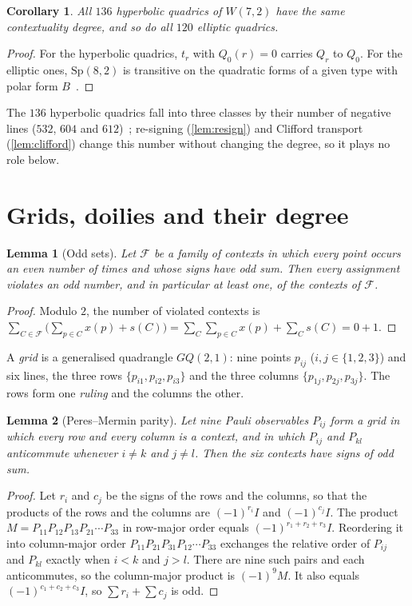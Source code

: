 \documentclass[11pt]{article}
\newtheorem{lemma}[lemma]{Lemma}
\newtheorem{corollary}[corollary]{Corollary}
\theoremstyle{definition}
\theoremstyle{remark}
\newcommand{\Sp}{\mathrm{Sp}}
\begin{document}
\begin{corollary}\label{cor:allquadrics}
All $136$ hyperbolic quadrics of $W(7,2)$ have the same contextuality degree, and so do all $120$ elliptic quadrics.
\end{corollary}
\begin{proof}
For the hyperbolic quadrics, $t_r$ with $Q_0(r)=0$ carries $Q_r$ to $Q_0$.
For the elliptic ones, $\Sp(8,2)$ is transitive on the quadratic forms of a given type with polar form $B$~\cite{Taylor92}.
\end{proof}

The $136$ hyperbolic quadrics fall into three classes by their number of negative lines ($532$, $604$ and $612$)~\cite{Muller23}; re-signing (\cref{lem:resign}) and Clifford transport (\cref{lem:clifford}) change this number without changing the degree, so it plays no role below.

\section{Grids, doilies and their degree}\label{sec:doily}

\begin{lemma}[Odd sets]\label{lem:odd}
Let $\mathcal F$ be a family of contexts in which every point occurs an even number of times and whose signs have odd sum. Then every assignment violates an odd number, and in particular at least one, of the contexts of $\mathcal F$.
\end{lemma}
\begin{proof}
Modulo $2$, the number of violated contexts is $\sum_{C\in\mathcal F}\bigl(\sum_{p\in C}x(p)+s(C)\bigr)=\sum_C\sum_{p\in C}x(p)+\sum_Cs(C)=0+1$.
\end{proof}

A \emph{grid} is a generalised quadrangle $GQ(2,1)$: nine points $p_{ij}$ ($i,j\in\{1,2,3\}$) and six lines, the three rows $\{p_{i1},p_{i2},p_{i3}\}$ and the three columns $\{p_{1j},p_{2j},p_{3j}\}$. The rows form one \emph{ruling} and the columns the other.

\begin{lemma}[Peres--Mermin parity]\label{lem:mermin}
Let nine Pauli observables $P_{ij}$ form a grid in which every row and every column is a context, and in which $P_{ij}$ and $P_{kl}$ anticommute whenever $i\ne k$ and $j\ne l$. Then the six contexts have signs of odd sum.
\end{lemma}
\begin{proof}
Let $r_i$ and $c_j$ be the signs of the rows and the columns, so that the products of the rows and the columns are $(-1)^{r_i}I$ and $(-1)^{c_j}I$.
The product $M=P_{11}P_{12}P_{13}P_{21}\cdots P_{33}$ in row-major order equals $(-1)^{r_1+r_2+r_3}I$.
Reordering it into column-major order $P_{11}P_{21}P_{31}P_{12}\cdots P_{33}$ exchanges the relative order of $P_{ij}$ and $P_{kl}$ exactly when $i<k$ and $j>l$.
There are nine such pairs and each anticommutes, so the column-major product is $(-1)^9M$.
It also equals $(-1)^{c_1+c_2+c_3}I$, so $\sum r_i+\sum c_j$ is odd.
\end{proof}
\end{document}
